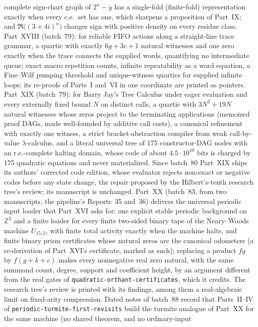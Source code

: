 \documentclass[11pt]{article}
\newcommand{\dir}[1]{\texttt{#1}}
\begin{document}
{complete sign-chart graph of $2^n-y$ has a single-fold (finite-fold)
representation exactly when every c.e.\ set has one, which sharpens a
proposition of Part~IX; and $\Re\bigl((3+4i)^n\bigr)$ changes sign with
positive density on every residue class.  Part~XVIII (batch~79): for
reliable FIFO actions along a straight-line trace grammar, a quartic with
exactly $6g+3c+1$ natural witnesses and one zero exactly when the trace
connects the supplied words, quantifying no intermediate queue; exact macro
repetition counts, infinite repeatability as a word equation, a Fine--Wilf
pumping threshold and unique-witness quartics for supplied infinite loops;
its re-proofs of Parts~I and~VI in one coordinate are printed as pointers.
Part~XIX (batch~79): for Barry Jay's Tree Calculus under eager evaluation
and every externally fixed bound $N$ on distinct calls, a quartic with
$3N^2+19N$ natural witnesses whose zeros project to the terminating
applications (memoized proof DAGs, made well-founded by additive call
costs), a canonical refinement with exactly one witness, a strict
bracket-abstraction compiler from weak call-by-value $\lambda$-calculus,
and a literal universal tree of 175 constructor-DAG nodes with an
r.e.-complete halting domain, whose code of about $4.5\cdot10^{10}$ bits
is charged by 175 quadratic equations and never materialized.  Since
batch~80 Part~XIX ships its authors' corrected code edition, whose
evaluator rejects non-exact or negative codes before any state change, the
repair proposed by the Hilbert's-tenth research tree's review; its
manuscript is unchanged.  Part~XX (batch~83, from two manuscripts, the
pipeline's Reports~35 and~36) delivers the universal periodic input loader
that Part~XVI asks for: one explicit stable periodic background on
$\mathbb Z^3$ and a finite loader for every finite two-sided binary tape of
the Neary--Woods machine $U_{15,2}$, with finite total activity exactly when
the machine halts, and finite binary prism certificates whose natural zeros
are the canonical odometers (a re-derivation of Part~XVI's certificate,
marked as such); replacing a product $fg$ by $f(g+k+c)$ makes every
nonnegative real zero natural, with the same summand count, degree, support
and coefficient height, by an argument different from the real gates of
\dir{quadratic-orthant-certificates}, which it credits.  The research tree's
review is printed with its findings, among them a real-algebraic limit on
fixed-arity compression.  Dated notes of batch~88 record that Parts~II--IV
of \dir{periodic-turmite-first-revisits} build the turmite analogue of
Part~XX for the same machine (no shared theorem, and no ordinary-input
}
\end{document}
